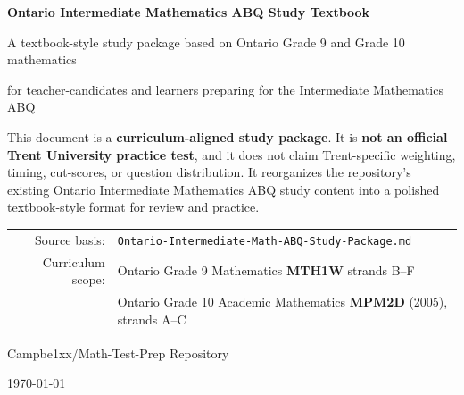 \documentclass[11pt,oneside]{book}
\newcommand{\coursecode}[1]{\textbf{#1}}
\begin{document}
\frontmatter

\begin{titlepage}
\centering
{\Huge\bfseries Ontario Intermediate Mathematics ABQ Study Textbook\par}
\vspace{1.5cm}
{\Large A textbook-style study package based on Ontario Grade 9 and Grade 10 mathematics\par}
\vspace{1cm}
{\large for teacher-candidates and learners preparing for the Intermediate Mathematics ABQ\par}
\vfill
\begin{tcolorbox}[width=0.9\textwidth,colback=SoftGold,colframe=Accent,title=Important Disclaimer,fonttitle=\bfseries]
This document is a \textbf{curriculum-aligned study package}. It is \textbf{not an official Trent University practice test}, and it does not claim Trent-specific weighting, timing, cut-scores, or question distribution. It reorganizes the repository's existing Ontario Intermediate Mathematics ABQ study content into a polished textbook-style format for review and practice.
\end{tcolorbox}
\vfill
\begin{tabular}{rl}
Source basis: & \texttt{Ontario-Intermediate-Math-ABQ-Study-Package.md} \\
Curriculum scope: & Ontario Grade 9 Mathematics \coursecode{MTH1W} strands B--F \\
& Ontario Grade 10 Academic Mathematics \coursecode{MPM2D} (2005), strands A--C
\end{tabular}
\vfill
{\large Campbe1xx/Math-Test-Prep Repository\par}
{\large \today\par}
\end{titlepage}
\end{document}
